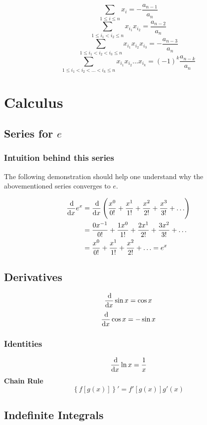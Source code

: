 \documentclass[oneside]{book} %
\theoremstyle{plain}
\newcommand*\reciprocal[1]{\frac{1}{#1}}
\begin{document}
\[\sum_{1 \le i \le n} x_i = - \frac{a_{n-1}}{a_n}\]
\[\sum_{1 \le i_1 < i_2 \le n} x_{i_1} x_{i_2} = \frac{a_{n-2}}{a_n}\]
\[\sum_{1 \le i_1 < i_2 < i_3 \le n} x_{i_1} x_{i_2} x_{i_3} = -
\frac{a_{n-3}}{a_n}\]
\[\sum_{1 \le i_1 < i_2 < ... < i_k \le n} x_{i_1} x_{i_2} ... x_{i_k} = (-1)^k
\frac{a_{n-k}}{a_n}\]

\chapter{Calculus}
\section{Series for \(e\)}

\subsection{Intuition behind this series}
The following demonstration should help one understand why the abovementioned
series converges to \(e\).

\begin{align*}
    \frac{\dif}{\dif x} e^x
    &= \frac{\dif}{\dif x} \left( \frac{x^0}{0!} + \frac{x^1}{1!} + \frac{x^2}{2!} + \frac{x^3}{3!} + \ldots \right) \\
    &= \frac{0 x^{-1}}{0!} + \frac{1 x^0}{1!} + \frac{2 x^1}{2!} + \frac{3 x^2}{3!} + \ldots \\
    &= \frac{x^0}{0!} + \frac{x^1}{1!} + \frac{x^2}{2!} + \ldots = e^x
\end{align*}

\section{Derivatives}
\[\frac{\dif}{\dif x} \sin x = \cos x\]
\[\frac{\dif}{\dif x} \cos x = -\sin x\]

\subsection{Identities}
\[\frac{\dif}{\dif x} \ln x = \reciprocal{x}\]
\textbf{Chain Rule}
\[\left\{f\left[g\left(x\right)\right]\right\}'
= f'\left[g\left(x\right)\right] g'\left(x\right)\]

\section{Indefinite Integrals}
\end{document}
